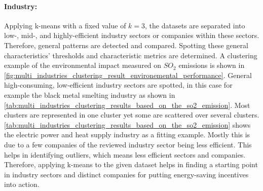 \paragraph*{Industry:}
Applying k-means with a fixed value of $k=3$, the datasets are separated into low-, mid-, and highly-efficient industry sectors or companies within these sectors.
Therefore, general patterns are detected and compared.
Spotting these general characteristics' thresholds and characteristic metrics are determined.
A clustering example of the environmental impact measured on $SO_2$ emissions is shown in \ref{fig:multi_industries_clustering_result_environemental_performance}.
General high-consuming, low-efficient industry sectors are spotted, in this case for example the black metal smelting industry as shown in \ref{tab:multi_industries_clustering_results_based_on_the_so2_emission}.
Most clusters are represented in one cluster yet some are scattered over several clusters.
\ref{tab:multi_industries_clustering_results_based_on_the_so2_emission} shows the electric power and heat supply industry as a fitting example.
Mostly this is due to a few companies of the reviewed industry sector being less efficient.
This helps in identifying outliers, which means less efficient sectors and companies.
Therefore, applying k-means to the given dataset helps in finding a starting point in industry sectors and distinct companies for putting energy-saving incentives into action.

